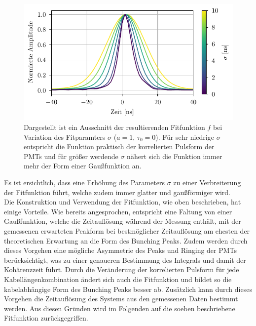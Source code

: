 \begin{figure}[h]
    \centering
    \includegraphics{images/Analysis/corr_pulses_diff_sigma.pdf}
    \caption{Dargestellt ist ein Ausschnitt der resultierenden Fitfunktion $f$ bei Variation des Fitparamters $\sigma$ ($a=1$, $\tau_0=0$). Für sehr niedrige $\sigma$ entspricht die Funktion praktisch der korrelierten Pulsform der PMTs und für größer werdende $\sigma$ nähert sich die Funktion immer mehr der Form einer Gaußfunktion an.}
    \label{fig:Fitfuktion für verschiedene sigma}
\end{figure}
Es ist ersichtlich, dass eine Erhöhung des Parameters $\sigma$ zu einer Verbreiterung der Fitfunktion führt, welche zudem immer glatter und gaußförmiger wird. \\

Die Konstruktion und Verwendung der Fitfunktion, wie oben beschrieben, hat einige Vorteile. 
Wie bereits angesprochen, entspricht eine Faltung von einer Gaußfunktion, welche die Zeitauflösung während der Messung enthält, mit der gemessenen erwarteten Peakform bei bestmöglicher Zeitauflösung am ehesten der theoretischen Erwartung an die Form des Bunching Peaks. 
Zudem werden durch dieses Vorgehen eine mögliche Asymmetrie des Peaks und Ringing der PMTs berücksichtigt, was zu einer genaueren Bestimmung des Integrals und damit der Kohärenzzeit führt. 
Durch die Veränderung der korrelierten Pulsform für jede Kabellängenkombination ändert sich auch die Fitfunktion und bildet so die kabelabhängige Form des Bunching Peaks besser ab. 
Zusätzlich kann durch dieses Vorgehen die Zeitauflösung des Systems aus den gemessenen Daten bestimmt werden. 
Aus diesen Gründen wird im Folgenden auf die soeben beschriebene Fitfunktion zurückgegriffen. 

